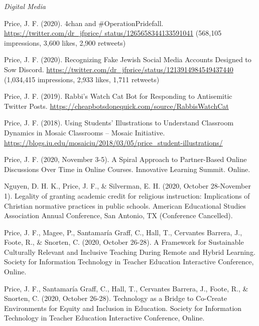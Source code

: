 \documentclass[11pt,article,oneside]{memoir}
\begin{document}
\bigskip
\noindent\emph{Digital Media \vspace{0.05in}}

\ind Price, J. F. (2020). 4chan and \#OperationPridefall. \href{https://twitter.com/dr\_jfprice/status/1265658344133591041}{https://twitter.com/dr\_jfprice/ \newline status/1265658344133591041} (568,105 impressions, 3,600 likes, 2,900 retweets)

\ind Price, J. F. (2020). Recognizing Fake Jewish Social Media Accounts Designed to Sow Discord. \href{https://twitter.com/dr\_jfprice/status/1213914984549437440}{https://twitter.com/dr\_jfprice/status/1213914984549437440} (1,034,415 impressions, 2,933 likes, 1,711 retweets)

\ind Price, J. F. (2019). Rabbi's Watch Cat Bot for Responding to Antisemitic Twitter Posts. \href{https://cheapbotsdonequick.com/source/RabbisWatchCat}{https://cheapbotsdonequick.com/source/RabbisWatchCat}

\ind Price, J. F. (2018). Using Students’ Illustrations to Understand Classroom Dynamics in Mosaic Classrooms – Mosaic Initiative. \href{https://blogs.iu.edu/mosaiciu/2018/03/05/price\_student-illustrations/}{https://blogs.iu.edu/\newline mosaiciu/2018/03/05/price\_student-illustrations/}


\newpage



\ind Price, J. F. (2020, November 3-5). A Spiral Approach to Partner-Based Online Discussions Over Time in Online Courses. Innovative Learning Summit. Online.

\ind Nguyen, D. H. K., Price, J. F., \& Silverman, E. H. (2020, October 28-November 1). Legality of granting academic credit for religious instruction: Implications of Christian normative practices in public schools. American Educational Studies Association Annual Conference, San Antonio, TX (Conference Cancelled).

\ind Price, J. F., Magee, P., Santamaría Graff, C., Hall, T., Cervantes Barrera, J., Foote, R., \& Snorten, C. (2020, October 26-28). A Framework for Sustainable Culturally Relevant and Inclusive Teaching During Remote and Hybrid Learning. Society for Information Technology in Teacher Education Interactive Conference, Online.

\ind Price, J. F., Santamaría Graff, C., Hall, T., Cervantes Barrera, J., Foote, R., \& Snorten, C. (2020, October 26-28). Technology as a Bridge to Co-Create Environments for Equity and Inclusion in Education. Society for Information Technology in Teacher Education Interactive Conference, Online.
\end{document}
